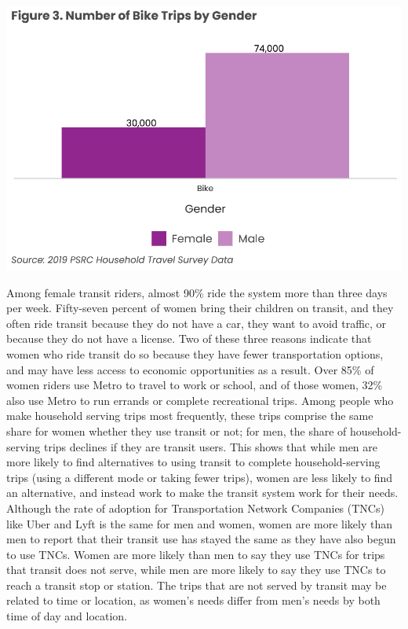 \documentclass[
  12pt,
]{article}
\begin{document}
\begin{flushleft}
\includegraphics{womens_history_story_draft_files/figure-latex/Bike trips-1.pdf}

\begin{flushleft}
Among female transit riders, almost 90\% ride the system more than three days per week. Fifty-seven percent of women bring their children on transit, and they often ride transit because they do not have a car, they want to avoid traffic, or because they do not have a license. Two of these three reasons indicate that women who ride transit do so because they have fewer transportation options, and may have less access to economic opportunities as a result. Over 85\% of women riders use Metro to travel to work or school, and of those women, 32\% also use Metro to run errands or complete recreational trips. Among people who make household serving trips most frequently, these trips comprise the same share for women whether they use transit or not; for men, the share of household-serving trips declines if they are transit users. This shows that while men are more likely to find alternatives to using transit to complete household-serving trips (using a different mode or taking fewer trips), women are less likely to find an alternative, and instead work to make the transit system work for their needs. Although the rate of adoption for Transportation Network Companies (TNCs) like Uber and Lyft is the same for men and women, women are more likely than men to report that their transit use has stayed the same as they have also begun to use TNCs. Women are more likely than men to say they use TNCs for trips that transit does not serve, while men are more likely to say they use TNCs to reach a transit stop or station. The trips that are not served by transit may be related to time or location, as women’s needs differ from men’s needs by both time of day and location.
\end{flushleft}


\end{flushleft}
\end{document}
